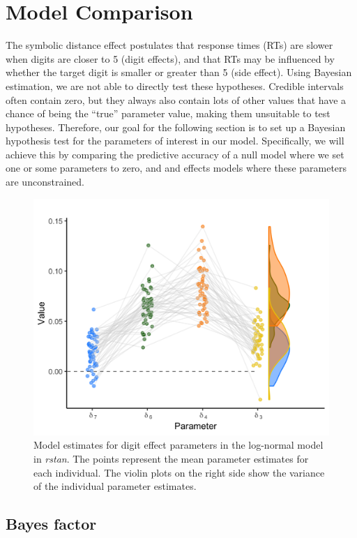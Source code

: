 \documentclass[
  english,
  doc,floatsintext]{apa6}
\begin{document}
\hypertarget{model-comparison}{%
\section{Model Comparison}\label{model-comparison}}

The symbolic distance effect postulates that response times (RTs) are slower when digits are closer to 5 (digit effects), and that RTs may be influenced by whether the target digit is smaller or greater than 5 (side effect). Using Bayesian estimation, we are not able to directly test these hypotheses. Credible intervals often contain zero, but they always also contain lots of other values that have a chance of being the ``true'' parameter value, making them unsuitable to test hypotheses. Therefore, our goal for the following section is to set up a Bayesian hypothesis test for the parameters of interest in our model. Specifically, we will achieve this by comparing the predictive accuracy of a null model where we set one or some parameters to zero, and and effects models where these parameters are unconstrained.

\begin{figure}[H]

\includegraphics[width=0.75\linewidth]{Images/Fig15_inddiflogplot_onlyrstan_v2} \hfill{}

\caption{Model estimates for digit effect parameters in the log-normal model in \textit{rstan}. The points represent the mean parameter estimates for each individual. The violin plots on the right side show the variance of the individual parameter estimates.}\label{fig:modeldigitestplotlog}
\end{figure}

\hypertarget{bayes-factor}{%
\subsection{Bayes factor}\label{bayes-factor}}
\end{document}
